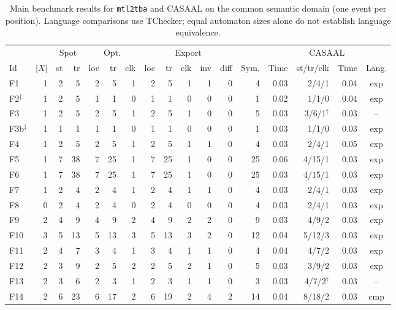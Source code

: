 \begin{table}[t]
\centering
\caption{Main benchmark results for \texttt{mtl2tba} and CASAAL on the common semantic domain (one event per position). Language comparisons use TChecker; equal automaton sizes alone do not establish language equivalence.}
\label{tab:evaluation}
\small
\setlength{\tabcolsep}{4.5pt}
\begin{tabular}{@{}lrrrrrrrrrrrrrrrc@{}}
\toprule
 & & \multicolumn{2}{c}{Spot} & \multicolumn{3}{c}{Opt.} & \multicolumn{5}{c}{Export} & & & \multicolumn{2}{c}{CASAAL} & \\
\cmidrule(lr){3-4}\cmidrule(lr){5-7}\cmidrule(lr){8-12}\cmidrule(lr){15-16}
Id & $|X|$ & st & tr & loc & tr & clk & loc & tr & clk & inv & diff & Sym. & Time & st/tr/clk & Time & Lang.\\
\midrule
F1 & 1 & 2 & 5 & 2 & 5 & 1 & 2 & 5 & 1 & 1 & 0 & 4 & 0.03 & 2/4/1 & 0.04 & exp\\
F2$^\ddagger$ & 1 & 2 & 5 & 1 & 1 & 0 & 1 & 1 & 0 & 0 & 0 & 1 & 0.02 & 1/1/0 & 0.04 & exp\\
F3 & 1 & 2 & 5 & 2 & 5 & 1 & 2 & 5 & 1 & 0 & 0 & 5 & 0.03 & 3/6/1$^\dagger$ & 0.03 & --\\
F3b$^\ddagger$ & 1 & 1 & 1 & 1 & 1 & 0 & 1 & 1 & 0 & 0 & 0 & 1 & 0.03 & 1/1/0 & 0.03 & exp\\
F4 & 1 & 2 & 5 & 2 & 5 & 1 & 2 & 5 & 1 & 1 & 0 & 4 & 0.03 & 2/4/1 & 0.05 & exp\\
F5 & 1 & 7 & 38 & 7 & 25 & 1 & 7 & 25 & 1 & 0 & 0 & 25 & 0.06 & 4/15/1 & 0.03 & exp\\
F6 & 1 & 7 & 38 & 7 & 25 & 1 & 7 & 25 & 1 & 0 & 0 & 25 & 0.03 & 4/15/1 & 0.03 & exp\\
F7 & 1 & 2 & 4 & 2 & 4 & 1 & 2 & 4 & 1 & 1 & 0 & 4 & 0.03 & 2/4/1 & 0.03 & exp\\
F8 & 0 & 2 & 4 & 2 & 4 & 0 & 2 & 4 & 0 & 0 & 0 & 4 & 0.03 & 2/4/1 & 0.03 & exp\\
F9 & 2 & 4 & 9 & 4 & 9 & 2 & 4 & 9 & 2 & 2 & 0 & 9 & 0.03 & 4/9/2 & 0.03 & exp\\
F10 & 3 & 5 & 13 & 5 & 13 & 3 & 5 & 13 & 3 & 2 & 0 & 12 & 0.04 & 5/12/3 & 0.03 & exp\\
F11 & 2 & 4 & 7 & 3 & 4 & 1 & 3 & 4 & 1 & 1 & 0 & 4 & 0.04 & 4/7/2 & 0.03 & exp\\
F12 & 2 & 3 & 9 & 2 & 5 & 2 & 2 & 5 & 2 & 1 & 0 & 5 & 0.03 & 3/9/2 & 0.03 & exp\\
F13 & 2 & 3 & 6 & 2 & 3 & 1 & 2 & 3 & 1 & 1 & 0 & 3 & 0.03 & 4/7/2$^\dagger$ & 0.03 & --\\
F14 & 2 & 6 & 23 & 6 & 17 & 2 & 6 & 19 & 2 & 4 & 2 & 14 & 0.04 & 8/18/2 & 0.03 & cmp\\

\end{tabular}
\end{table}
